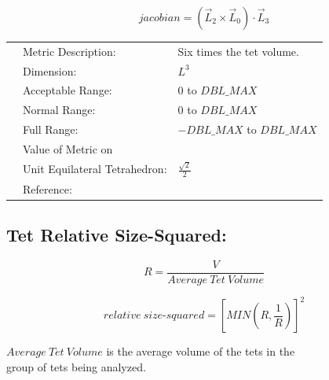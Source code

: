 \documentclass[12pt]{article}
\begin{document}
\begin{displaymath}
jacobian = \left( \vec L_2 \times \vec L_0 \right) \cdot \vec L_3  
\end{displaymath}

\begin{tabular}{lll}
& Metric Description:  & Six times the tet volume. \\
& Dimension:           & $L^3$  \\ 
& Acceptable Range:    & 0 to $DBL\_MAX$ \\ 
& Normal Range:        & 0 to $DBL\_MAX$ \\ 
& Full Range:          & $-DBL\_MAX$ to $DBL\_MAX$                       \\ 
& Value of Metric on   &  \\
& Unit Equilateral Tetrahedron:    & $\frac { \sqrt{2} } {2} $ \\
& Reference:           & \cite{two} \\
\end{tabular} 


\subsection*{Tet Relative Size-Squared:}


\begin{displaymath}
R = \frac{V} {Average~Tet~Volume}
\end{displaymath}

\begin{displaymath}
relative~size \textrm{-}squared =  [ MIN( R, \frac {1}{R}) ]^2
\end{displaymath}

\begin{flushleft}
$Average ~ Tet ~ Volume$  is the average volume of the tets in the \\
group of tets being analyzed. \\
\end{flushleft}
\end{document}
